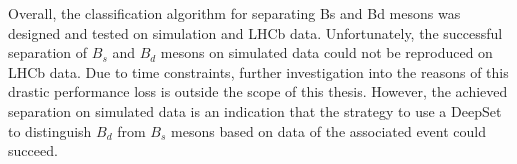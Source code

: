 Overall, the classification algorithm for separating Bs and Bd mesons was designed and tested on simulation and LHCb data. 
Unfortunately, the successful separation of $B_s$ and $B_d$ mesons on simulated data could not be reproduced on LHCb data.
Due to time constraints, further investigation into the reasons of this drastic performance loss is outside the scope of this thesis.
However, the achieved separation on simulated data is an indication that the strategy to use a DeepSet to distinguish $B_d$ from $B_s$ mesons based on data of the associated event could succeed.

